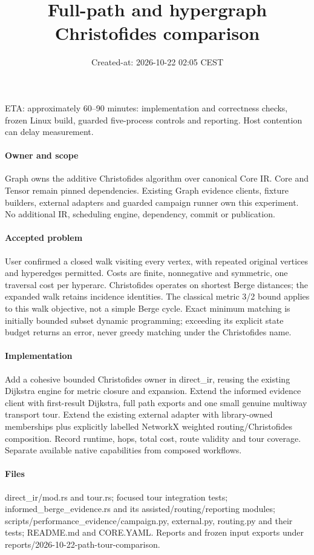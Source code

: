 \documentclass[10pt]{article}
\title{Full-path and hypergraph Christofides comparison}
\date{Created-at: 2026-10-22 02:05 CEST}
\begin{document}
\maketitle
\noindent ETA: approximately 60--90 minutes: implementation and correctness checks, frozen Linux build, guarded five-process controls and reporting. Host contention can delay measurement.
\paragraph{Owner and scope} Graph owns the additive Christofides algorithm over canonical Core IR. Core and Tensor remain pinned dependencies. Existing Graph evidence clients, fixture builders, external adapters and guarded campaign runner own this experiment. No additional IR, scheduling engine, dependency, commit or publication.
\paragraph{Accepted problem} User confirmed a closed walk visiting every vertex, with repeated original vertices and hyperedges permitted. Costs are finite, nonnegative and symmetric, one traversal cost per hyperarc. Christofides operates on shortest Berge distances; the expanded walk retains incidence identities. The classical metric 3/2 bound applies to this walk objective, not a simple Berge cycle. Exact minimum matching is initially bounded subset dynamic programming; exceeding its explicit state budget returns an error, never greedy matching under the Christofides name.
\paragraph{Implementation} Add a cohesive bounded Christofides owner in direct\_ir, reusing the existing Dijkstra engine for metric closure and expansion. Extend the informed evidence client with first-result Dijkstra, full path exports and one small genuine multiway transport tour. Extend the existing external adapter with library-owned memberships plus explicitly labelled NetworkX weighted routing/Christofides composition. Record runtime, hops, total cost, route validity and tour coverage. Separate available native capabilities from composed workflows.
\paragraph{Files} direct\_ir/mod.rs and tour.rs; focused tour integration tests; informed\_berge\_evidence.rs and its assisted/routing/reporting modules; scripts/performance\_evidence/campaign.py, external.py, routing.py and their tests; README.md and CORE.YAML. Reports and frozen input exports under reports/2026-10-22-path-tour-comparison.
\end{document}
